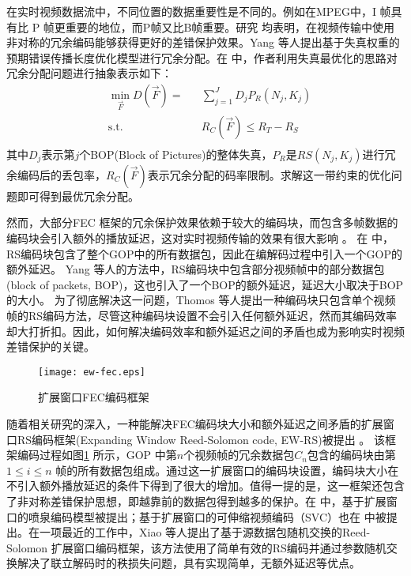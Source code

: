 在实时视频数据流中，不同位置的数据重要性是不同的。例如在MPEG中，I 帧具有比 P 帧更重要的地位，而P帧又比B帧重要。研究 \cite{yang2005unequal, zhang2011transmission, zhang2012novel, zhou2014novel} 均表明，在视频传输中使用非对称的冗余编码能够获得更好的差错保护效果。Yang \cite{yang2005unequal} 等人提出基于失真权重的预期错误传播长度优化模型进行冗余分配。在 \cite{zhang2011transmission} 中，作者利用失真最优化的思路对冗余分配问题进行抽象表示如下：
\begin{equation}
\begin{aligned}
& \underset{\vec F}{\min}D(\vec F) =
& &  \sum_{j=1}^J D_j P_R(N_j, K_j) \\
& \text{s.t.}
& & R_C(\vec F) \le R_T - R_S \\
\end{aligned}
\end{equation}
其中$D_j$表示第$j$个BOP(Block of Pictures)的整体失真，$P_R$是$RS(N_j, K_j)$进行冗余编码后的丢包率，$R_C(\vec F)$表示冗余分配的码率限制。求解这一带约束的优化问题即可得到最优冗余分配。

然而，大部分FEC 框架的冗余保护效果依赖于较大的编码块，而包含多帧数据的编码块会引入额外的播放延迟，这对实时视频传输的效果有很大影响 \cite{wang2000error}。
在 \cite{baccaglini2008slice, bouabdallah2006dependency} 中，RS编码块包含了整个GOP中的所有数据包，因此在编解码过程中引入一个GOP的额外延迟。
Yang \cite{yang2005unequal} 等人的方法中，RS编码块中包含部分视频帧中的部分数据包(block of packets, BOP)，这也引入了一个BOP的额外延迟，延迟大小取决于BOP的大小。
为了彻底解决这一问题，Thomos \cite{thomos2006robust} 等人提出一种编码块只包含单个视频帧的RS编码方法，尽管这种编码块设置不会引入任何额外延迟，然而其编码效率却大打折扣。因此，如何解决编码效率和额外延迟之间的矛盾也成为影响实时视频差错保护的关键。

\begin{figure}[htbp]
  \centering
  \texttt{[image: ew-fec.eps]}
  \caption{扩展窗口FEC编码框架}
  \label{fig:ew_fec}
\end{figure}

随着相关研究的深入，一种能解决FEC编码块大小和额外延迟之间矛盾的扩展窗口RS编码框架(Expanding Window Reed-Solomon code, EW-RS)被提出 \cite{sejdinovic2009expanding}。 该框架编码过程如图\ref{fig:ew_fec} 所示，GOP 中第$n$个视频帧的冗余数据包$C_n$包含的编码块由第$1\le i\le n$ 帧的所有数据包组成。通过这一扩展窗口的编码块设置，编码块大小在不引入额外播放延迟的条件下得到了很大的增加。值得一提的是，这一框架还包含了非对称差错保护思想，即越靠前的数据包得到越多的保护。在 \cite{sejdinovic2009expanding, nazir2011expanding} 中，基于扩展窗口的喷泉编码模型被提出；基于扩展窗口的可伸缩视频编码（SVC）也在 \cite{vukobratovic2009scalable, hellge2011layer} 中被提出。在一项最近的工作中，Xiao \cite{xiao2013real} 等人提出了基于源数据包随机交换的Reed-Solomon 扩展窗口编码框架，该方法使用了简单有效的RS编码并通过参数随机交换解决了联立解码时的秩损失问题，具有实现简单，无额外延迟等优点。
